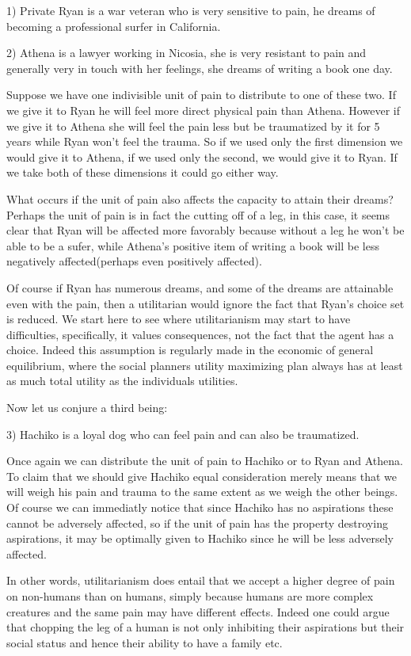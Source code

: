 \documentclass[12pt]{report}
\numberwithin{equation}{section}
\begin{document}
1) Private Ryan is a war veteran who is very sensitive to pain, he dreams of becoming a professional surfer in California. 

2) Athena is a lawyer working in Nicosia, she is very resistant to pain and generally very in touch with her feelings, she dreams of writing a book one day.

Suppose we have one indivisible unit of pain to distribute to one of these two. If we give it to Ryan he will feel more direct physical pain than Athena. However if we give it to Athena she will feel the pain less but be traumatized by it for 5 years while Ryan won't feel the trauma. So if we used only the first dimension we would give it to Athena, if we used only the second, we would give it to Ryan. If we take both of these dimensions it could go either way. 

What occurs if the unit of pain also affects the capacity to attain their dreams? Perhaps the unit of pain is in fact the cutting off of a leg, in this case, it seems clear that Ryan will be affected more favorably because without a leg he won't be able to be a sufer, while Athena's positive item of writing a book will be less negatively affected(perhaps even positively affected). 

Of course if Ryan has numerous dreams, and some of the dreams are attainable even with the pain, then a utilitarian would ignore the fact that Ryan's choice set is reduced. We start here to see where utilitarianism may start to have difficulties, specifically, it values consequences, not the fact that the agent has a choice. Indeed this assumption is regularly made in the economic of general equilibrium, where the social planners utility maximizing plan always has at least as much total utility as the individuals utilities. 

Now let us conjure a third being: 

3) Hachiko is a loyal dog who can feel pain and can also be traumatized. 

Once again we can distribute the unit of pain to Hachiko or to Ryan and Athena. To claim that we should give Hachiko equal consideration merely means that we will weigh his pain and trauma to the same extent as we weigh the other beings. Of course we can immediatly notice that since Hachiko has no aspirations these cannot be adversely affected, so if the unit of pain has the property destroying aspirations, it may be optimally given to Hachiko since he will be less adversely affected. 

In other words, utilitarianism does entail that we accept a higher degree of pain on non-humans than on humans, simply because humans are more complex creatures and the same pain may have different effects. Indeed one could argue that chopping the leg of a human is not only inhibiting their aspirations but their social status and hence their ability to have a family etc. 
\end{document}
